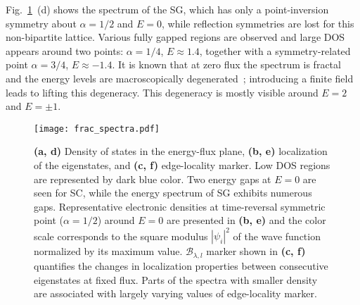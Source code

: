 Fig.~\ref{fig:frac_spect}~(d) shows the spectrum of the SG, which has only a point-inversion symmetry about $\alpha=1/2$ and $E=0$, while reflection symmetries are lost for this non-bipartite lattice. Various fully gapped regions are observed and large DOS appears around two points: $\alpha = 1/4$, $E \approx 1.4$, together with a symmetry-related point $\alpha = 3/4$, $E \approx -1.4$. It is known that at zero flux the spectrum is fractal and the energy levels are macroscopically degenerated~\cite{PhysRevB.28.3110}; introducing a finite field leads to lifting this degeneracy. This degeneracy is mostly visible around $E = 2$ and $E = \pm 1$.

\begin{figure}[H]
\centering
\texttt{[image: frac\_spectra.pdf]} 
\caption[Spectral and eigenstate localization properties of Sierpiński carpet and gasket]{\textbf{(a, d)} Density of states in the energy-flux plane, \textbf{(b, e)} localization of the eigenstates, and \textbf{(c, f)} edge-locality marker. Low DOS regions are represented by dark blue color. Two energy gaps at $E = 0$ are seen for SC, while the energy spectrum of SG exhibits numerous gaps. Representative electronic densities at time-reversal symmetric point ($\alpha = 1/2$) around $E = 0$ are presented in \textbf{(b, e)} and the color scale corresponds to the square modulus $| \psi_i|^2$ of the wave function normalized by its maximum value. $\mathcal{B}_{\lambda, l}$ marker shown in \textbf{(c, f)} quantifies the changes in localization properties between consecutive eigenstates at fixed flux. Parts of the spectra with smaller density are associated with largely varying values of edge-locality marker.}
\label{fig:frac_spect}
\end{figure}

